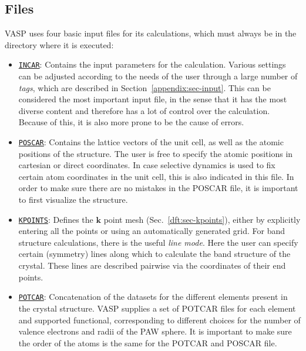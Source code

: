 \begin{refsection}
\subsection{Files} \label{appendix:sec-files}
 
\gls{VASP} uses four basic input files for its calculations, which 
must always be in the directory where it is executed:
 
\begin{itemize} 
 
 \label{appendix:sec-INCAR} 
\item \href{https://www.vasp.at/wiki/index.php/INCAR}{\texttt{INCAR}}: 
Contains the input parameters for the calculation. Various settings can be 
adjusted according to the needs of the user through a large number of 
\textit{tags}, which are described in Section~\ref{appendix:sec-input}. This 
can be considered the most important input file, in the sense that it has 
the most diverse content and therefore has a lot of control over the 
calculation. Because of this, it is also more prone to be the cause of errors. 
 
 \label{appendix:sec-POSCAR} 
\item \href{https://www.vasp.at/wiki/index.php/POSCAR}{\texttt{POSCAR}}: 
Contains the lattice vectors of the unit cell, as well as the atomic positions 
of the structure. The user is free to specify the atomic positions in cartesian 
or direct coordinates. In case selective dynamics is used to fix certain atom 
coordinates in the unit cell, this is also indicated in this file. In order to 
make sure there are no mistakes in the POSCAR file, it is important to first 
visualize the structure. 
 
 \label{appendix:sec-KPOINTS} 
\item \href{https://www.vasp.at/wiki/index.php/KPOINTS}{\texttt{KPOINTS}}: 
Defines the $\mathbf{k}$ point mesh (Sec.~\ref{dft:sec-kpoints}), either by 
explicitly entering all the points or using an automatically generated 
 grid. For band structure calculations, there is the useful 
\textit{line mode}. Here the user can specify certain (symmetry) lines along 
which to calculate the band structure of the crystal. These lines are described 
pairwise via the coordinates of their end points.
 
 \label{appendix:sec-POTCAR} 
\item \href{https://www.vasp.at/wiki/index.php/POTCAR}{\texttt{POTCAR}}: 
Concatenation of the  
datasets for the different elements present in the crystal structure. \gls{VASP} 
supplies a set of POTCAR files for each element and supported functional, 
corresponding to different choices for the number of valence electrons and 
radii of the \gls{PAW} sphere. It is important to make sure the order of the atoms 
is the same for the POTCAR and POSCAR file. 


\end{itemize}
\end{refsection}

